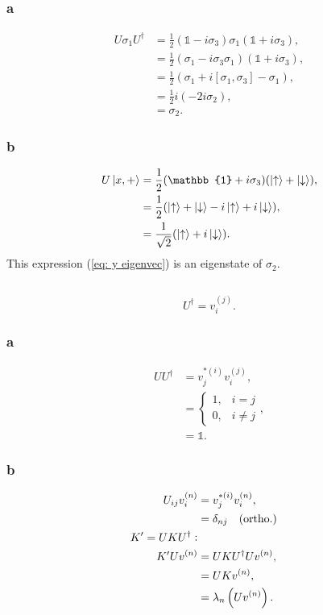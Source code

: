 \documentclass[a4paper,12pt,twoside]{article}
\begin{document}
\begin{multicols*}{2}
\subsubsection*{a}
\begin{align}
    U\sigma_1U^\dagger &= \frac{1}{2}(\mathbb{1}-i\sigma_3)\sigma_1(\mathbb{1}+i\sigma_3),\\
    &= \frac{1}{2}(\sigma_1 - i\sigma_3\sigma_1)(\mathbb{1}+i\sigma_3),\\
    &= \frac{1}{2}(\sigma_1+i[\sigma_1,\sigma_3] - \sigma_1),\\
    &= \frac{1}{2} i (-2i\sigma_2),\\
    &= \sigma_2.
\end{align}
\subsubsection*{b}
\begin{align}
    U\ket{x,+} &= \frac{1}{2}(\mathbb{1}+i\sigma_3)(\ket{\uparrow}+\ket{\downarrow}),\\
    &= \frac{1}{2}(\ket{\uparrow}+\ket{\downarrow}-i\ket{\uparrow}+i\ket{\downarrow}),\\
    &= \frac{1}{\sqrt{2}}(\ket{\uparrow}+i\ket{\downarrow}).
    \label{eq: y eigenvec}
\end{align}
This expression (\ref{eq: y eigenvec}) is an eigenstate of $\sigma_2$.
\subsection{}%
\begin{equation}
    U^\dagger = v_i^{(j)}.
\end{equation}
\subsubsection*{a}
\begin{align}
    UU^\dagger &= v_j^{*(i)}v_i^{(j)},\\
    &= \left\{\begin{array}{lr}
        1, & i=j \\
        0, & i\neq j
    \end{array}\right.,\\
    &= \mathbb{1}.
\end{align}
\subsubsection*{b}
\begin{align}
    U_{ij} v_i^{(n)} &= v_j^{*(i)}v_i^{(n)},\\
    &= \delta_{nj}\qq{(ortho.)}\\
    K' = UKU^\dagger:&\\
    K'U v^{(n)} &= UKU^\dagger U v^{(n)},\\
    &= UK v^{(n)},\\
    &= \lambda_n \left(Uv^{(n)}\right).
\end{align}

\end{multicols*}
\end{document}
